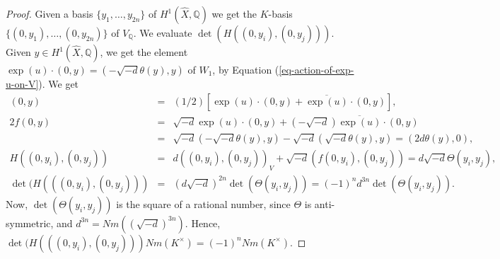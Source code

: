\documentclass[12pt]{amsart}
\numberwithin{equation}{subsection}
\theoremstyle{plain}
\theoremstyle{definition}
\newcommand{\QQ}{{\mathbb Q}}
\begin{document}
\begin{proof}
Given a basis $\{y_1, \dots, y_{2n}\}$ of $H^1(\hat{X},\QQ)$ we get the $K$-basis 
$\{(0,y_1), \dots, (0,y_{2n})\}$ of $V_\QQ$.
We evaluate $\det (H((0,y_i),(0,y_j)))$.
Given $y\in H^1(\hat{X},\QQ)$, we get the element $\exp(u)\cdot (0,y)=(-\sqrt{-d}\theta(y),y)$ of $W_1$, by Equation (\ref{eq-action-of-exp-u-on-V}).
We get
\begin{eqnarray*}
(0,y)&=&(1/2)[\exp(u)\cdot (0,y)+\overline{\exp(u)}\cdot(0,y)],
\\
2f(0,y)&=& \sqrt{-d}\exp(u)\cdot (0,y)+(-\sqrt{-d})\overline{\exp(u)}\cdot(0,y)
\\
&=& \sqrt{-d}(-\sqrt{-d}\theta(y),y)-\sqrt{-d}(\sqrt{-d}\theta(y),y)=(2d\theta(y),0),
\\
H((0,y_i),(0,y_j))&=& d((0,y_i),(0,y_j))_V+\sqrt{-d}(f(0,y_i),(0,y_j))
=d\sqrt{-d}\Theta(y_i,y_j),
\\
\det(H(((0,y_i),(0,y_j)))&=&(d\sqrt{-d})^{2n}\det(\Theta(y_i,y_j))=(-1)^nd^{3n}\det(\Theta(y_i,y_j)).
\end{eqnarray*}
Now, $\det(\Theta(y_i,y_j))$ is the square of a rational number, since $\Theta$ is anti-symmetric, and $d^{3n}=Nm((\sqrt{-d})^{3n})$.
Hence, $\det(H(((0,y_i),(0,y_j)))Nm(K^\times)= (-1)^nNm(K^\times).$
\end{proof}
\end{document}
